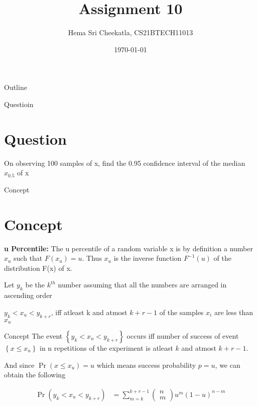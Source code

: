 \documentclass{beamer}
\title{Assignment 10}
\author{Hema Sri Cheekatla, CS21BTECH11013}
\date{\today}
\providecommand{\pr}[1]{\ensuremath{\Pr\left(#1\right)}}
\providecommand{\cbrak}[1]{\ensuremath{\left\{#1\right\}}}
\theoremstyle{remark}
\newcommand{\myvec}[1]{\ensuremath{\begin{pmatrix}#1\end{pmatrix}}}
\numberwithin{equation}{subsection}
\begin{document}
\begin{frame}
    \titlepage 
\end{frame}

\logo{}


\begin{frame}{Outline}
    \tableofcontents
\end{frame}

\begin{frame}{Questioin}
\section{Question}
    On observing 100 samples of x, find the 0.95 confidence interval of the median $x_{0.5}$ of x
\end{frame}

\begin{frame}{Concept}

\section{Concept}
 \textbf{u Percentile:}\newline
    The u percentile of a random variable x is by definition a number $x_u$
such that $F(x_u) = u$. Thus $x_u$ is the inverse function $F^{-1}(u)$ of the distribution F(x)
of x.\newline

Let $y_k$ be the $k^{th}$ number assuming that all the numbers are arranged in ascending order\newline

$y_k < x_u < y_{k+r}$, iff atleast k and atmost $k+r-1$ of the samples $x_i$ are less than $x_u$

\end{frame}

\begin{frame}{Concept}
    The event $\cbrak{y_k < x_u < y_{k+r}}$ occurs iff number of success of event $\cbrak{x \leq x_u}$ in n repetitions of the experiment is atleast $k$ and atmost $k+r-1$.\newline

    And since $\pr{x \leq x_u} = u$ which means success probability $p=u$, we can obtain the following
    
    \begin{align}
        \pr{y_k < x_u < y_{k+r}} &= \sum_{m=k}^{k+r-1} \myvec{n \\ m} u^m (1-u)^{n-m} 
    \end{align}

\end{frame}
\end{document}
